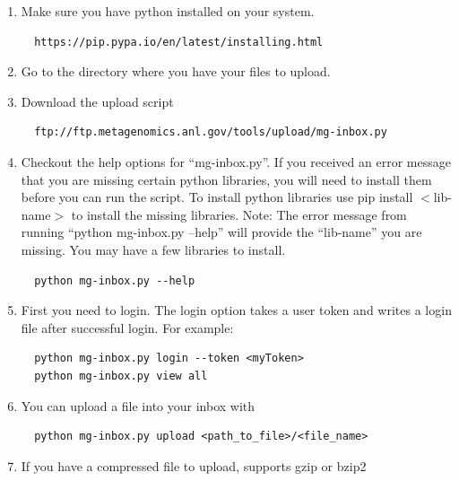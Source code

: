 \documentclass[12pt,fullpage]{report}
\begin{document}
\begin{enumerate}
\item Make sure you have python installed on your system.
\begin{small}
\begin{lstlisting}
  https://pip.pypa.io/en/latest/installing.html
\end{lstlisting}
\end{small}
\item Go to the directory where you have your files to upload.

\item Download the upload script
\begin{small}
\begin{lstlisting}
  ftp://ftp.metagenomics.anl.gov/tools/upload/mg-inbox.py
\end{lstlisting}
\end{small}
\item Checkout the help options for “mg-inbox.py”. If you received an error message that you are missing certain python libraries, you will need to install them before you can run the script. To install python libraries use pip install $<$lib-name$>$ to install the missing libraries.
Note: The error message from running “python mg-inbox.py --help” will provide the “lib-name” you are missing. You may have a few libraries to install.
\begin{small}
\begin{lstlisting}
  python mg-inbox.py --help
\end{lstlisting}
\end{small}
\item First you need to login. The login option takes a user token and writes a login file after successful login. For example:
\begin{small}
\begin{lstlisting}
  python mg-inbox.py login --token <myToken>
  python mg-inbox.py view all
\end{lstlisting}
\end{small}
\item You can upload a file into your inbox with
\begin{small}
\begin{lstlisting}
  python mg-inbox.py upload <path_to_file>/<file_name>
\end{lstlisting}
\end{small}
\item If you have a compressed file to upload, supports gzip or bzip2
\begin{small}

\end{small}
\end{enumerate}
\end{document}
